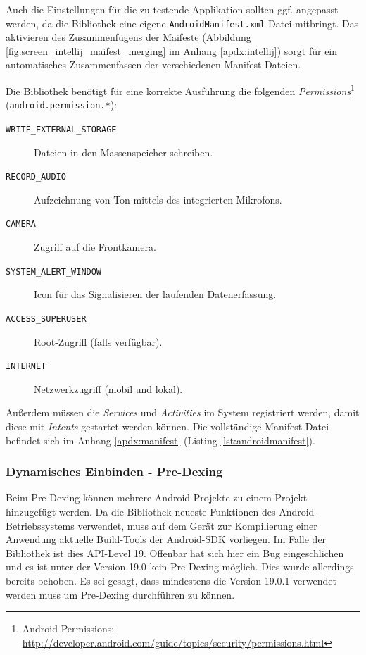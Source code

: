 Auch die Einstellungen für die zu testende Applikation sollten ggf. angepasst werden, da die Bibliothek eine eigene \texttt{AndroidManifest.xml} Datei mitbringt.
Das aktivieren des Zusammenfügens der Maifeste (Abbildung \ref{fig:screen_intellij_maifest_merging} im Anhang \ref{apdx:intellij}) sorgt für ein automatisches Zusammenfassen der verschiedenen Manifest-Dateien.



Die Bibliothek benötigt für eine korrekte Ausführung die folgenden \emph{Permissions}\footnote{Android Permissions: \url{http://developer.android.com/guide/topics/security/permissions.html}}\\ (\texttt{android.permission.*}):

\begin{description}
	\item[\texttt{WRITE\_EXTERNAL\_STORAGE}]
		Dateien in den Massenspeicher schreiben.
	\item[\texttt{RECORD\_AUDIO}]
		Aufzeichnung von Ton mittels des integrierten Mikrofons.
	\item[\texttt{CAMERA}]
		Zugriff auf die Frontkamera.
	\item[\texttt{SYSTEM\_ALERT\_WINDOW}]
		Icon für das Signalisieren der laufenden Datenerfassung.
	\item[\texttt{ACCESS\_SUPERUSER}]
		Root-Zugriff (falls verfügbar).
	\item[\texttt{INTERNET}]
		Netzwerkzugriff (mobil und lokal).
\end{description}

Außerdem müssen die \emph{Services} und \emph{Activities} im System registriert werden, damit diese mit \emph{Intents} gestartet werden können. Die vollständige Manifest-Datei befindet sich im Anhang \ref{apdx:manifest} (Listing \ref{lst:androidmanifest}).


\subsubsection{Dynamisches Einbinden - Pre-Dexing}
Beim Pre-Dexing können mehrere Android-Projekte zu einem Projekt hinzugefügt werden. 
Da die Bibliothek neueste Funktionen des Android-Betriebssystems verwendet, muss auf dem  Gerät zur Kompilierung einer Anwendung aktuelle Build-Tools der Android-SDK vorliegen.
Im Falle der Bibliothek ist dies API-Level 19. Offenbar hat sich hier ein Bug eingeschlichen und es ist unter der Version 19.0 kein Pre-Dexing möglich.
Dies wurde allerdings bereits behoben. Es sei gesagt, dass mindestens die Version 19.0.1 verwendet werden muss um Pre-Dexing durchführen zu können.



